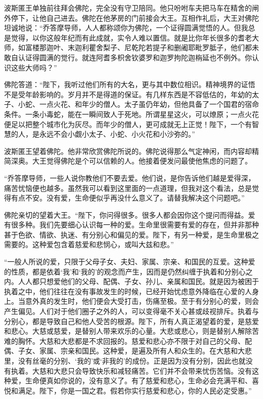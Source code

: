 \documentclass[12pt,twoside,openany]{book}
\begin{document}
波斯匿王单独前往拜会佛陀，完全没有守卫陪同。他只吩咐车夫把马车在精舍的闸外停下，让他自己进去。佛陀在他茅房的门前接会大王。互相作礼后，大王对佛陀坦诚地说：“乔答摩导师，人人都称颂你为佛陀，一个证得圆满觉悟的人。但我总是觉得，以你这般年纪而有此成就，实令人难以置信。就是比你年长很多的耆老大师，如富楼那迦叶、末迦利瞿舍梨子、尼乾陀若提子和删阇耶毗罗胝子，他们都未敢自认证得圆满的觉行。就连阿耆多枳舍钦婆罗和迦罗拘陀迦栴延也不例外。你认识这些大师吗？”

佛陀答道：“陛下，我听过他们所有的大名，更与其中数位相识。精神境界的证悟不是受年龄影响的。岁月并不是得道的保证。有几样东西是不容低估的，年幼的太子、小蛇、一点火花、和年少的僧人。太子虽仍年幼，但他具备了一个国君的宿命条件。一条小毒蛇，能在一瞬间致人于死地。所谓星星这火，可以燎原；一点火花便足以把整个城市化为灰尽。而年少的僧人，更可成就无上正觉！陛下，一个有智慧的人，是永远不会小觑小太子、小蛇、小火花和小沙弥的。”

波斯匿王望着佛陀。他非常欣赏佛陀所说的。佛陀说得那么气定神闲，而内容却精简深奥。大王觉得佛陀是个可以信赖的人。他接着便发问最使他焦虑的问题了。

“乔答摩导师，一些人说你教他们不要去爱。他们说，是你告诉他们越是爱得深，痛苦忧恼便也越多。虽然我可以看到这里面的一点道理，但我对这个看法，总是觉得有点不安。没有爱，生命便似乎再没什么意义了。请替我解决这个问题吧。”

佛陀亲切的望着大王。“陛下，你问得很多。很多人都会因你这个提问而得益。爱有很多种。我们先要细心认识每一种的爱。生命里很需要有爱的存在，但并非那种甚于色欲、情欲、执迷、有分别心和偏见的爱。陛下，有另一种爱，是生命里极之需要的。这种爱包含着慈爱和悲悯心，或叫大兹和悲。”

“一般人所说的爱，只限于父母子女、夫妇、家属、宗亲、和国民的互爱。这种爱的性质，都是依着‘我’和‘我的’的观念而产生，因而是仍然纠缠于执着和分别心之内。人人都只想爱他们的父母、配偶、子女、孙儿、亲属和国民。就是因为被困于执着之中，他们往往在没有事故发生的时候，已经开始忧虑意外降临在心爱的人身上。当意外真的发生时，他们便会大受打击，伤痛至极。至于有分别心的爱，则会产生偏见。人们对于他们圈子之外的人，可以变得毫不关心甚或歧视排斥。执着与分别心，都是导致自己和他人受苦的根源。陛下，所有人真正渴望着的爱，是慈爱和悲心。大慈或慈爱，是替别人带来欢乐的心量。大悲或悲心，则是替别人解除苦难的胸怀。大慈和大悲都是不求回报的。慈爱和悲心亦不限于对自己的父母、配偶、子女、家属、宗亲和国民。这种爱，是遍及所有人和众生的。在大慈和大悲里，没有丝毫的分别、‘我的’或‘非我的’的成份。正是因为没有分别，因此也就没有执着。大慈和大悲只会导致快乐和减轻痛苦。它们并不会带来忧伤苦恼。没有这种爱，生命便真如你说的，没有意义了。有了慈爱和悲心，生命必会充满平和、喜悦和满足。陛下，你是一国之君。假若你实行慈爱和悲心，你的人民必定受惠。”
\end{document}
